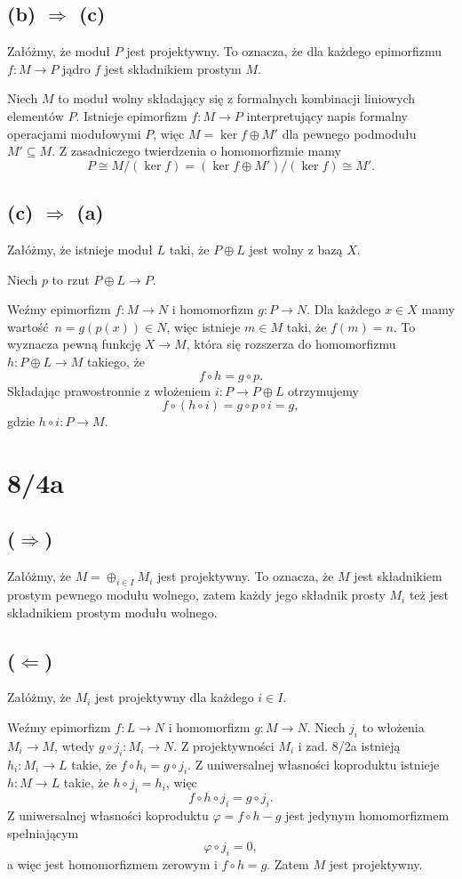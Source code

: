 \documentclass[a4paper, 12pt]{article}
\newcommand{\+}{\enspace}
\begin{document}
\subsection*{(b) $⇒$ (c)}
Załóżmy, że moduł $P$ jest projektywny.
To oznacza, że dla każdego
epimorfizmu $f: M → P$ jądro $f$ jest składnikiem prostym $M$.

Niech $M$ to moduł wolny składający się z formalnych
kombinacji liniowych elementów $P$.
Istnieje epimorfizm $f: M → P$ interpretujący
napis formalny operacjami modułowymi $P$,
więc $M = \ker f ⊕ M'$ dla pewnego podmodułu $M' ⊆ M$.
Z zasadniczego twierdzenia o homomorfizmie mamy
$$P ≅ M/(\ker f) = (\ker f ⊕ M')/(\ker f) ≅ M'.$$

\subsection*{(c) $⇒$ (a)}
Załóżmy, że istnieje moduł $L$ taki, że $P ⊕ L$ jest wolny z bazą $X$.

Niech $p$ to rzut $P ⊕ L → P$.

Weźmy epimorfizm $f: M → N$ i homomorfizm $g: P → N$.
Dla każdego $x∈X$ mamy wartość $n=g(p(x))∈N$,
więc istnieje
$m∈M$ taki,
że $f(m) = n$.
To wyznacza pewną funkcję $X → M$,
która się rozszerza do homomorfizmu
$h: P ⊕ L → M$ takiego,
że $$f ∘ h = g ∘ p.$$
Składając prawostronnie z włożeniem $i: P → P ⊕ L$ otrzymujemy
$$f ∘ (h ∘ i) = g ∘ p ∘ i = g,$$
gdzie $h ∘ i: P → M$.



\section*{8/4a}

\subsection*{($⇒$)}
Załóżmy, że $M=⊕_{i∈I} M_i$ jest projektywny.
To oznacza, że $M$ jest składnikiem prostym pewnego modułu wolnego,
zatem każdy jego składnik prosty $M_i$ też jest składnikiem prostym modułu wolnego.

\subsection*{($⇐$)}
Załóżmy,
że $M_i$ jest projektywny dla każdego $i ∈ I$.

Weźmy epimorfizm $f: L → N$ i homomorfizm $g: M → N$.
Niech $j_i$ to włożenia $M_i → M$, wtedy
$g ∘ j_i: M_i → N$.
Z projektywności $M_i$ i zad. 8/2a
istnieją $h_i: M_i → L$ takie, że $f∘h_i=g∘j_i$.
Z uniwersalnej własności koproduktu istnieje $h: M → L$ takie,
że $h ∘ j_i = h_i$, więc
$$f∘h∘j_i = g∘j_i.$$
Z uniwersalnej własności koproduktu $φ=f∘h-g$ jest jedynym
homomorfizmem spełniającym
$$φ∘j_i = 0,$$
a więc jest homomorfizmem zerowym i $f∘h=g$.
Zatem $M$ jest projektywny.
\end{document}
